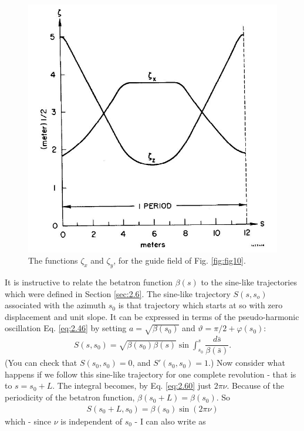 \begin{figure}[!htb]
	\centering
	\includegraphics[width=0.8\linewidth]{./Figuras/fig18.jpeg}
	\caption{The functions $\zeta_x$ and $\zeta_y$, for the guide field of Fig. \ref{fig:fig10}.}
	\label{fig:fig18}
\end{figure}

It is instructive to relate the betatron function $\beta(s)$ to the sine-like trajectories which were defined in Section \ref{sec:2.6}. The sine-like trajectory $S(s, s_o)$ associated with the azimuth $s_0$ is that trajectory which starts at so with zero displacement
and unit slope. It can be expressed in terms of the pseudo-harmonic oscillation Eq. \eqref{eq:2.46} by setting $a = \sqrt{\beta(s_0)}$ and $\vartheta = \pi/2+\varphi(s_0)$:
\begin{align}
	S(s,s_0) = \sqrt{\beta(s_0)\beta(s)}\sin\int_{s_0}^s\dfrac{d\bar{s}}{\beta(\bar{s})}.
\end{align}
(You can check that $S(s_0, s_0) = 0$, and $S'(s_0, s_0) = 1$.) Now consider what happens if we follow this sine-like trajectory for one complete revolution - that is to $s = s_0 + L$. The integral becomes, by Eq. \eqref{eq:2.60} just $2\pi\nu$. Because of the periodicity of the betatron function, $\beta(s_0 + L) = \beta(s_0)$. So
\begin{align}
	S(s_0+L,s_0)=\beta(s_0)\sin{(2\pi\nu)}
\end{align}
which - since $\nu$ is independent of $s_0$ - I can also write as


